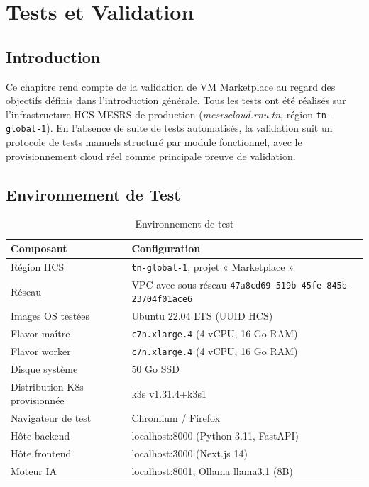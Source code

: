 \chapter{Tests et Validation}

\section{Introduction}

Ce chapitre rend compte de la validation de VM Marketplace au regard des objectifs
définis dans l'introduction générale. Tous les tests ont été réalisés sur
l'infrastructure HCS MESRS de production (\textit{mesrscloud.rnu.tn}, région
\texttt{tn-global-1}). En l'absence de suite de tests automatisés, la validation
suit un protocole de tests manuels structuré par module fonctionnel, avec le
provisionnement cloud réel comme principale preuve de validation.

\section{Environnement de Test}

\begin{table}[H]
\centering
\caption{Environnement de test}
\label{tab:test_env}
\begin{tabularx}{\linewidth}{lX}
\toprule
\textbf{Composant} & \textbf{Configuration} \\
\midrule
Région HCS & \texttt{tn-global-1}, projet « Marketplace » \\
Réseau & VPC avec sous-réseau \texttt{47a8cd69-519b-45fe-845b-23704f01ace6} \\
Images OS testées & Ubuntu 22.04 LTS (UUID HCS) \\
Flavor maître & \texttt{c7n.xlarge.4} (4 vCPU, 16 Go RAM) \\
Flavor worker & \texttt{c7n.xlarge.4} (4 vCPU, 16 Go RAM) \\
Disque système & 50 Go SSD \\
Distribution K8s provisionnée & k3s v1.31.4+k3s1 \\
Navigateur de test & Chromium / Firefox \\
Hôte backend & localhost:8000 (Python 3.11, FastAPI) \\
Hôte frontend & localhost:3000 (Next.js 14) \\
Moteur IA & localhost:8001, Ollama llama3.1 (8B) \\
\bottomrule
\end{tabularx}
\end{table}


